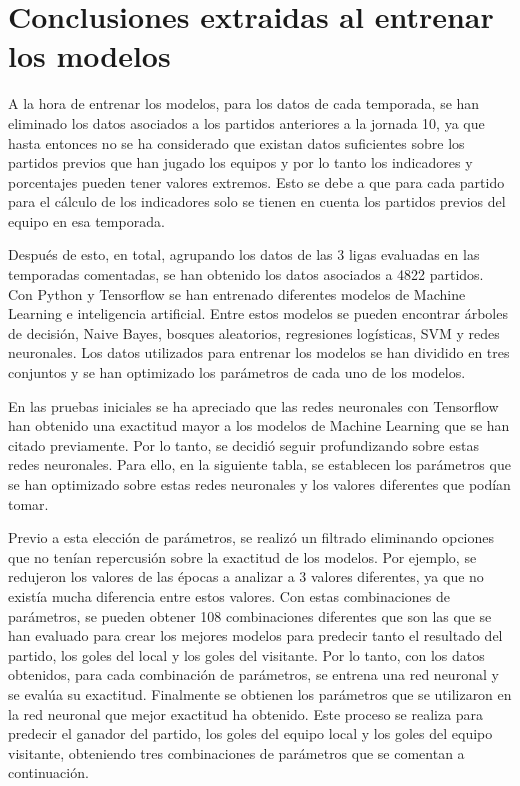\section{Conclusiones extraidas al entrenar los modelos}

A la hora de entrenar los modelos, para los datos de cada temporada, se han eliminado los datos 
asociados a los partidos anteriores a la jornada 10, ya que hasta entonces no se ha considerado 
que existan datos suficientes sobre los partidos previos que han jugado los equipos y por lo tanto 
los indicadores y porcentajes pueden tener valores extremos. Esto se debe a que para cada partido 
para el cálculo de los indicadores solo se tienen en cuenta los partidos previos del equipo en esa 
temporada.

Después de esto, en total, agrupando los datos de las 3 ligas evaluadas en las temporadas 
comentadas, se han obtenido los datos asociados a 4822 partidos. 
Con Python y Tensorflow se han entrenado diferentes modelos de Machine Learning e 
inteligencia artificial. Entre estos modelos se pueden encontrar árboles de decisión, Naive Bayes, 
bosques aleatorios, regresiones logísticas, SVM y redes neuronales. Los datos utilizados para 
entrenar los modelos se han dividido en tres conjuntos y se han optimizado los parámetros de cada 
uno de los modelos.

En las pruebas iniciales se ha apreciado que las redes neuronales con Tensorflow han obtenido 
una exactitud mayor a los modelos de Machine Learning que se han citado previamente. Por lo 
tanto, se decidió seguir profundizando sobre estas redes neuronales. Para ello, en la siguiente 
tabla, se establecen los parámetros que se han optimizado sobre estas redes neuronales y los 
valores diferentes que podían tomar.


Previo a esta elección de parámetros, se realizó un filtrado eliminando opciones que no tenían 
repercusión sobre la exactitud de los modelos. Por ejemplo, se redujeron los valores de las épocas 
a analizar a 3 valores diferentes, ya que no existía mucha diferencia entre estos valores. Con estas 
combinaciones de parámetros, se pueden obtener 108 combinaciones diferentes que son las que 
se han evaluado para crear los mejores modelos para predecir tanto el resultado del partido, los 
goles del local y los goles del visitante. Por lo tanto, con los datos obtenidos, para cada 
combinación de parámetros, se entrena una red neuronal y se evalúa su exactitud. Finalmente se 
obtienen los parámetros que se utilizaron en la red neuronal que mejor exactitud ha obtenido. Este 
proceso se realiza para predecir el ganador del partido, los goles del equipo local y los goles del 
equipo visitante, obteniendo tres combinaciones de parámetros que se comentan a continuación.

